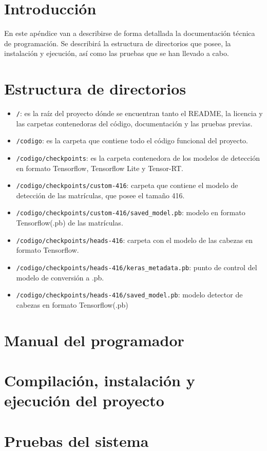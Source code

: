 
\section{Introducción}
En este apéndice van a describirse de forma detallada la documentación técnica de programación. Se describirá la estructura de directorios que posee, la instalación y ejecución, así como las pruebas que se han llevado a cabo. 
\section{Estructura de directorios}
\begin{itemize}
    \tightlist
    \item \texttt{/}: es la raíz del proyecto dónde se encuentran tanto el README, la licencia y las carpetas contenedoras del código, documentación y las pruebas previas.
    \item \texttt{/codigo}: es la carpeta que contiene todo el código funcional del proyecto.
    \item \texttt{/codigo/checkpoints}: es la carpeta contenedora de los modelos de detección en formato Tensorflow, Tensorflow Lite y Tensor-RT.
    \item \texttt{/codigo/checkpoints/custom-416}: carpeta que contiene el modelo de detección de las matrículas, que posee el tamaño 416.
    \item \texttt{/codigo/checkpoints/custom-416/saved\_model.pb}: modelo en formato Tensorflow(.pb) de las matrículas.
    \item \texttt{/codigo/checkpoints/heads-416}: carpeta con el modelo de las cabezas en formato Tensorflow.
    \item \texttt{/codigo/checkpoints/heads-416/keras\_metadata.pb}: punto de control del modelo de conversión a .pb.
    \item \texttt{/codigo/checkpoints/heads-416/saved\_model.pb}: modelo detector de cabezas en formato Tensorflow(.pb)    
\end{itemize}

\section{Manual del programador}

\section{Compilación, instalación y ejecución del proyecto}

\section{Pruebas del sistema}
